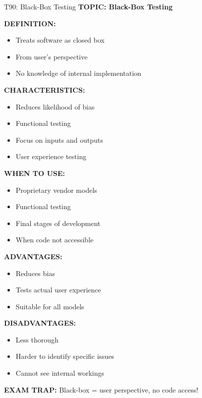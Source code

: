 \documentclass[8pt]{beamer}
\begin{document}
	\begin{frame}{T90: Black-Box Testing}
		\fontsize{6.5}{7.5}\selectfont
		\textbf{TOPIC: Black-Box Testing}
		
		\vspace{0.1cm}
		\textbf{DEFINITION:}
		\begin{itemize}
			\item Treats software as closed box
			\item From user's perspective
			\item No knowledge of internal implementation
		\end{itemize}
		
		\vspace{0.1cm}
		\textbf{CHARACTERISTICS:}
		\begin{itemize}
			\item Reduces likelihood of bias
			\item Functional testing
			\item Focus on inputs and outputs
			\item User experience testing
		\end{itemize}
		
		\vspace{0.1cm}
		\textbf{WHEN TO USE:}
		\begin{itemize}
			\item Proprietary vendor models
			\item Functional testing
			\item Final stages of development
			\item When code not accessible
		\end{itemize}
		
		\vspace{0.1cm}
		\textbf{ADVANTAGES:}
		\begin{itemize}
			\item Reduces bias
			\item Tests actual user experience
			\item Suitable for all models
		\end{itemize}
		
		\vspace{0.1cm}
		\textbf{DISADVANTAGES:}
		\begin{itemize}
			\item Less thorough
			\item Harder to identify specific issues
			\item Cannot see internal workings
		\end{itemize}
		
		\textcolor{myred}{\textbf{EXAM TRAP:}} Black-box = \textcolor{myblue}{user perspective, no code access}!
	\end{frame}
	
\end{document}
